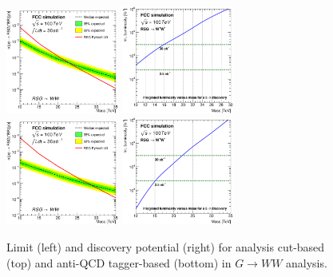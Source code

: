 \documentclass{cernrep}
\begin{document}
\begin{figure}[!htb]\centering
\includegraphics[width=0.33\textwidth]{Fig/RSGww/lim_RSGraviton_ww_fcc_v02_cut.eps}
\includegraphics[width=0.33\textwidth]{Fig/RSGww/DiscoveryPotential_ww_cut_rootStyle.eps}
\includegraphics[width=0.33\textwidth]{Fig/RSGww/lim_RSGraviton_ww_fcc_v02_tagger.eps}
\includegraphics[width=0.33\textwidth]{Fig/RSGww/DiscoveryPotential_ww_tagger_rootStyle.eps}
\caption{Limit (left) and discovery potential (right) for analysis cut-based (top) and anti-QCD tagger-based (bottom) in $G \rightarrow WW$ analysis.}
\label{fig:RSWww_limit}
\end{figure}
\end{document}
